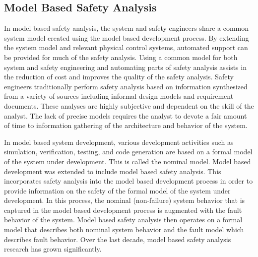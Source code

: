 \subsection{Model Based Safety Analysis}
\label{sec:mbsa}

In model based safety analysis, the system and safety engineers share a common system model created using the model based development process. By extending the system model and relevant physical control systems, automated support can be provided for much of the safety analysis. Using a common model for both system and safety engineering and automating parts of safety analysis assists in the reduction of cost and improves the quality of the safety analysis. Safety engineers traditionally perform safety analysis based on information synthesized from a variety of sources including informal design models and requirement documents. These analyses are highly subjective and dependent on the skill of the analyst. The lack of precise models requires the analyst to devote a fair amount of time to information gathering of the architecture and behavior of the system. 

In model based system development, various development activities such as simulation, verification, testing, and code generation are based on a formal model of the system under development\cite{Joshi05:Dasc}. This is called the nominal model. Model based development was extended to include model based safety analysis\cite{Joshi05:Dasc,Joshi05:SafeComp,Joshi07:Hase,DBLP:conf/cav/BozzanoCPJKPRT15,CAV2015:BoCiGrMa,info17:HaLuHo}. This incorporates safety analysis into the model based development process in order to provide information on the safety of the formal model of the system under development. In this process, the nominal (non-failure) system behavior that is captured in the model based development process is augmented with the fault behavior of the system. Model based safety analysis then operates on a formal model that describes both nominal system behavior and the fault model which describes fault behavior. Over the last decade, model based safety analysis research has grown significantly. 





